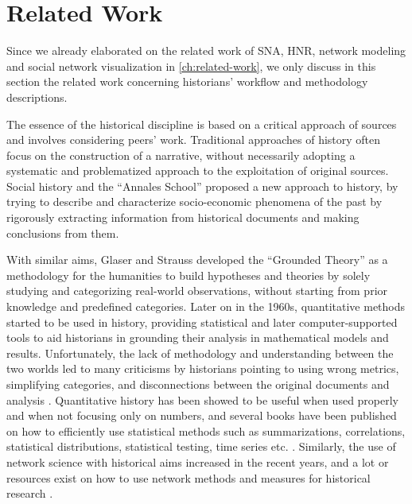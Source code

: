 \section{Related Work}

Since we already elaborated on the related work of SNA, HNR, network modeling and social network visualization in \autoref{ch:related-work}, we only discuss in this section the related work concerning historians' workflow and methodology descriptions.

The essence of the historical discipline is based on a critical approach of sources and involves considering peers' work.
Traditional approaches of history often focus on the construction of a narrative, without necessarily adopting a systematic and problematized approach to the exploitation of original sources.
Social history and the ``Annales School'' proposed a new approach to history, by trying to describe and characterize socio-economic phenomena of the past by rigorously extracting information from historical documents and making conclusions from them.

With similar aims, Glaser and Strauss developed the ``Grounded Theory'' \cite{glaserDiscoveryGroundedTheory2010} as a methodology for the humanities to build hypotheses and theories by solely studying and categorizing real-world observations, without starting from prior knowledge and predefined categories.
Later on in the 1960s, quantitative methods started to be used in history, providing statistical and later computer-supported tools to aid historians in grounding their analysis in mathematical models and results.
Unfortunately, the lack of methodology and understanding between the two worlds led to many criticisms by historians pointing to using wrong metrics, simplifying categories, and disconnections between the original documents and analysis \cite{karila-cohenNouvellesCuisinesHistoire2018, lemercierBackSourcesPracticing2021}.
Quantitative history has been showed to be useful when used properly and when not focusing only on numbers, and several books have been published on how to efficiently use statistical methods such as summarizations, correlations, statistical distributions, statistical testing, time series etc. \cite{hudsonHistoryNumbersIntroduction2016, lemercierQuantitativeMethodsHumanities2019}.
Similarly, the use of network science with historical aims increased in the recent years, and a lot or resources exist on how to use network methods and measures for historical research \cite{lemercier12FormalNetwork2015, kerschbaumerPowerNetworksProspects2015}.

